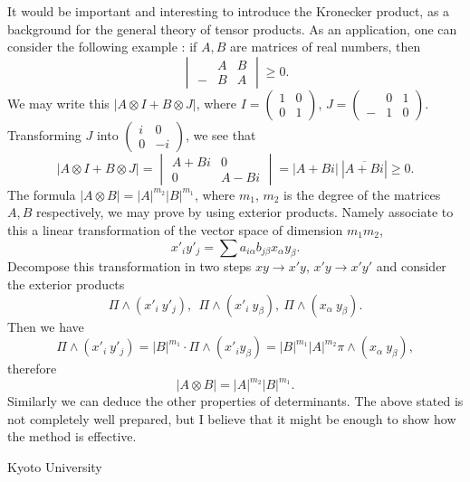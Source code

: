 It would be important and interesting to introduce the Kronecker
product, as a background for the general theory of tensor products. As
an application, one can consider the following example : if $A,B$ are
matrices of real numbers, then 
$$
\begin{vmatrix}
& A&B\\
-&B&A
\end{vmatrix} \geqslant 0.
$$
We may write this $|A \otimes I + B \otimes J|$, where $I
= \begin{pmatrix}
1&0\\
0&1
\end{pmatrix}$, $J = \begin{pmatrix}
&0&1\\
-&1&0
\end{pmatrix}$. 
Transforming $J$ into $\begin{pmatrix}
i&0\\
0&-i
\end{pmatrix}$, we see that
$$
|A \otimes I + B \otimes J| = \begin{vmatrix}
A+ Bi & 0 \\
0 & A - Bi
\end{vmatrix} =  |A + Bi|~ |\overline{A+ Bi}| \geqslant 0.
$$
The formula $|A\otimes B| = |A|^{m_2} |B|^{m_1}$, where $m_1$, $m_2$
is the degree of the matrices $A,B$ respectively, we may prove by
using exterior products. Namely associate to this a linear
transformation of the vector space of dimension $m_1 m_2$,
$$
x'_i y'_j = \sum a_{i\alpha} b_{j\beta} x_{\alpha} y_{\beta} .
$$
Decompose this transformation in two steps $xy \to x'y$, $x'y \to
x'y'$ and consider the exterior products
$$
\Pi \wedge (x'_i ~y'_j), ~~\Pi \wedge (x'_i ~y_\beta), ~ \Pi \wedge
(x_{\alpha} ~y_{\beta}).
$$\pageoriginale
Then we have
$$
\Pi \wedge (x'_i ~ y'_j) = |B|^{m_1} \cdot \Pi \wedge (x'_i y_{\beta})
= |B|^{m_1} |A|^{m_2} \pi \wedge (x_{\alpha} ~ y_\beta),
$$
therefore
$$
|A \otimes B| = |A|^{m_2} |B|^{m_1}.
$$
Similarly we can deduce the other properties of determinants. The
above stated is not completely well prepared, but I believe that it
might be enough to show how the method is effective. 

\bigskip
\bigskip

\noindent
{\fontsize{9pt}{11pt}\selectfont
Kyoto University}\relax

